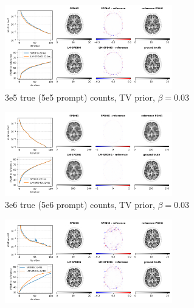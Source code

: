 \begin{figure}
  \centering
  \begin{subfigure}[]{1.0\textwidth}
    \centering
    \includegraphics[width=0.8\textwidth]{./figs/brain2d_counts_3.0E+05_seed_1_beta_3.0E-02_prior_TV_niter_ref_20000_fwhm_4.5_4.5_niter_100.png}
    \caption{3e5 true (5e5 prompt) counts, TV prior, $\beta = 0.03$}
  \end{subfigure}
  \vfill
  \begin{subfigure}[]{1.0\textwidth}
    \centering
    \includegraphics[width=0.8\textwidth]{./figs/brain2d_counts_3.0E+06_seed_1_beta_3.0E-02_prior_TV_niter_ref_20000_fwhm_4.5_4.5_niter_100.png}
    \caption{3e6 true (5e6 prompt) counts, TV prior, $\beta = 0.03$}
  \end{subfigure}
  \vfill
  \begin{subfigure}[]{1.0\textwidth}
    \centering
    \includegraphics[width=0.8\textwidth]{./figs/brain2d_counts_3.0E+05_seed_1_beta_1.0E-01_prior_DTV_niter_ref_20000_fwhm_4.5_4.5_niter_100.png}

\end{subfigure}
\end{figure}
